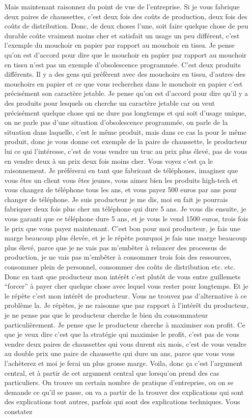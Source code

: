 \begin{small}
Mais maintenant raisonnez du point de vue de l'entreprise. Si je vous fabrique deux paires de chaussettes, c'est deux fois des coûts de production, deux fois des coûts de distribution. Donc, de deux choses l'une, soit faire quelque chose de peu durable coûte vraiment moins cher et satisfait un usage un peu différent, c'est l'exemple du mouchoir en papier par rapport au mouchoir en tissu. Je pense qu'on est d'accord pour dire que le mouchoir en papier par rapport au mouchoir en tissu n'est pas un exemple d'obsolescence programmée. C'est deux produits différents. Il y a des gens qui préfèrent avec des mouchoirs en tissu, d'autres des mouchoirs en papier et ce que vous recherchez dans le mouchoir en papier c'est précisément son caractère jetable. Je pense qu'on est d'accord pour dire qu'il y a des produits pour lesquels on cherche un caractère jetable car on veut précisément quelque chose qui ne dure pas longtemps et qui soit d'usage unique, on ne parle pas d'une situation d'obsolescence programmée, on parle de la situation dans laquelle, c'est le même produit, mais dans ce cas la pour le même produit, donc je vous donne cet exemple de la paire de chaussette, le producteur lui ce qui l'intéresse, c'est de vous vendre un truc au prix plus élevé, pas de vous en vendre deux à un prix deux fois moins cher. Vous voyez c'est ça le raisonnement. Je préférerai en tant que fabricant de téléphones, imaginez que vous êtes un client vous êtes jeunes, vous aimez bien les produits high-tech et vous changez de téléphone tous les ans, et vous payez 500 euros par ans pour changer de téléphone. Je suis producteur je me dis, moi en fait je pourrais fabriquer deux fois plus cher un téléphone qui dure 5 ans. Je vous dis ensuite, je vous garanti que ce téléphone dure 5 ans, et je vous le vend 1500 euros, trois fois le prix que vous payez maintenant. C'est bon pour moi producteur, je fais une marge beaucoup plus élevée, et je le répète pourquoi je fais une marge beaucoup plus élevé, parce que je ne vais pas m'embêter à relancer des processus de production, je ne vais pas m'embêter à consommer trois fois des ressources, consommer plein de personnel, consommer des coûts de distribution etc. etc. Donc en tant que producteur mon intérêt c'est plutôt de vous entre guillemets “forcer” à payer cher quelque chose avec lequel vous rester pour longtemps. Et je le répète c'est mon intérêt de producteur. Vous ne trouvez pas d'alternative à ce problème la. Je répètes, je ne raisonne que par rapport à l'intérêt du producteur, je ne pense pas que le producteur cherche le bien du consommateur particulièrement. Je pense que le producteur cherche à maximiser son profit. Ce que je veux dire c'est que la stratégie qui maximise le profit, c'est pas de vous vendre deux paires de chaussettes qui vous durent six mois, c'est de vous vendre au double prix une paire de chaussette qui dure un ans, parce que vous vous l'achèterez et moi je ferai un plus grosse marge. Voila, donc ça c'est l'argument central, et à partir de cet argument central que lorsqu'on prend des cas particuliers. On trouve un certain nombre de pratique d'entreprise, ou on se demande ce qu'il se passe, on va a partir de la trouver des explications qui sont des explications tout autres, parfois qui sont des explications techniques. Vous constatez 
\end{small}
